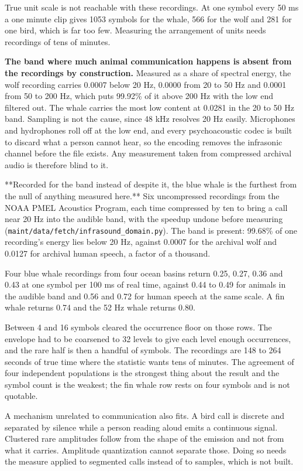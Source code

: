 True unit scale is not reachable with these recordings. At one symbol every 50 ms a one minute clip gives 1053 symbols for the whale, 566 for the wolf and 281 for one bird, which is far too few. Measuring the arrangement of units needs recordings of tens of minutes.

\textbf{The band where much animal communication happens is absent from the recordings by construction.} Measured as a share of spectral energy, the wolf recording carries 0.0007 below 20 Hz, 0.0000 from 20 to 50 Hz and 0.0001 from 50 to 200 Hz, which puts 99.92\% of it above 200 Hz with the low end filtered out. The whale carries the most low content at 0.0281 in the 20 to 50 Hz band. Sampling is not the cause, since 48 kHz resolves 20 Hz easily. Microphones and hydrophones roll off at the low end, and every psychoacoustic codec is built to discard what a person cannot hear, so the encoding removes the infrasonic channel before the file exists. Any measurement taken from compressed archival audio is therefore blind to it.

**Recorded for the band instead of despite it, the blue whale is the furthest from the null of anything measured here.** Six uncompressed recordings from the NOAA PMEL Acoustics Program, each time compressed by ten to bring a call near 20 Hz into the audible band, with the speedup undone before measuring (\texttt{maint/\allowbreak{}data/\allowbreak{}fetch/\allowbreak{}infrasound\_\allowbreak{}domain.\allowbreak{}py}). The band is present: 99.68\% of one recording's energy lies below 20 Hz, against 0.0007 for the archival wolf and 0.0127 for archival human speech, a factor of a thousand.

Four blue whale recordings from four ocean basins return 0.25, 0.27, 0.36 and 0.43 at one symbol per 100 ms of real time, against 0.44 to 0.49 for animals in the audible band and 0.56 and 0.72 for human speech at the same scale. A fin whale returns 0.74 and the 52 Hz whale returns 0.80.

Between 4 and 16 symbols cleared the occurrence floor on those rows. The envelope had to be coarsened to 32 levels to give each level enough occurrences, and the rare half is then a handful of symbols. The recordings are 148 to 264 seconds of true time where the statistic wants tens of minutes. The agreement of four independent populations is the strongest thing about the result and the symbol count is the weakest; the fin whale row rests on four symbols and is not quotable.

A mechanism unrelated to communication also fits. A bird call is discrete and separated by silence while a person reading aloud emits a continuous signal. Clustered rare amplitudes follow from the shape of the emission and not from what it carries. Amplitude quantization cannot separate those. Doing so needs the measure applied to segmented calls instead of to samples, which is not built.

